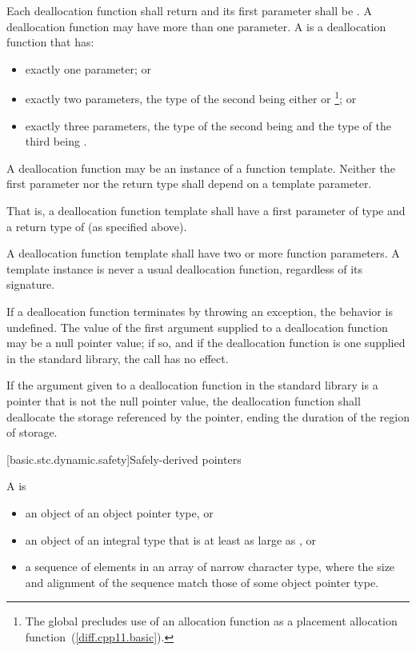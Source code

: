 \pnum
{}%
Each deallocation function shall return  and its first
parameter shall be . A deallocation function may have more
than one parameter.
%
A  is a deallocation function that has:
\begin{itemize}
\item
exactly one parameter; or
\item
exactly two parameters,
the type of the second being either
 or
%
\footnote{The global 
precludes use of an
allocation function  as a placement
allocation function~(\ref{diff.cpp11.basic}).}; or
\item
exactly three parameters,
the type of the second being 
and
the type of the third being .
\end{itemize}
A deallocation function may be an instance of a function
template. Neither the first parameter nor the return type shall depend
on a template parameter. \begin{note} That is, a deallocation function
template shall have a first parameter of type  and a return
type of  (as specified above). \end{note} A deallocation
function template shall have two or more function parameters. A template
instance is never a usual deallocation function, regardless of its
signature.

\pnum
If a deallocation function terminates by throwing an exception, the behavior is undefined.
The value of the first argument supplied to a deallocation function may
be a null pointer value; if so, and if the deallocation function is one
supplied in the standard library, the call has no effect.

\pnum
If the argument given to a deallocation function in the standard library
is a pointer that is not the null pointer value, the
deallocation function shall deallocate the storage referenced by the
pointer, ending the duration of the region of storage.

[basic.stc.dynamic.safety]{Safely-derived pointers}

\pnum
{}%
%
A  is
\begin{itemize}
\item an object of an object pointer
type, or
\item an object of an integral type that is at least as large as ,
or
\item a sequence of elements in an array of narrow character
type, where the size and alignment of the sequence
match those of some object pointer type.
\end{itemize}

